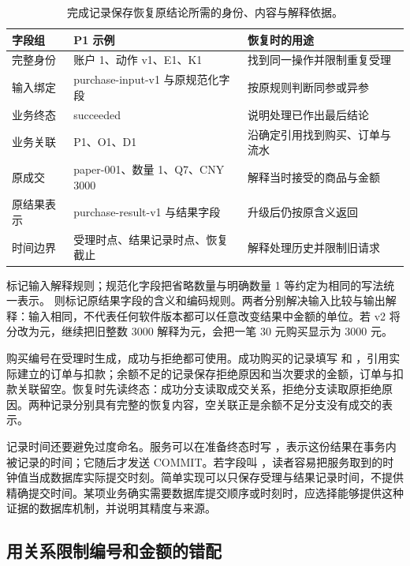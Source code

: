 \begin{table}[htbp]
\centering\small
\begin{tabularx}{\linewidth}{@{}p{2cm}p{4.8cm}X@{}}
\toprule
字段组 & P1 示例 & 恢复时的用途\\
\midrule
完整身份 & 账户 1、动作 v1、E1、K1 & 找到同一操作并限制重复受理\\
输入绑定 & purchase-input-v1 与原规范化字段 & 按原规则判断同参或异参\\
业务终态 & succeeded & 说明处理已作出最后结论\\
业务关联 & P1、O1、D1 & 沿确定引用找到购买、订单与流水\\
原成交 & paper-001、数量 1、Q7、CNY 3000 & 解释当时接受的商品与金额\\
原结果表示 & purchase-result-v1 与结果字段 & 升级后仍按原含义返回\\
时间边界 & 受理时点、结果记录时点、恢复截止 & 解释处理历史并限制旧请求\\
\bottomrule
\end{tabularx}
\caption{完成记录保存恢复原结论所需的身份、内容与解释依据。}
\end{table}

 标记输入解释规则；规范化字段把省略数量与明确数量 1 等约定为相同的写法统一表示。 则标记原结果字段的含义和编码规则。两者分别解决输入比较与输出解释：输入相同，不代表任何软件版本都可以任意改变结果中金额的单位。若 v2 将分改为元，继续把旧整数 3000 解释为元，会把一笔 30 元购买显示为 3000 元。

购买编号在受理时生成，成功与拒绝都可使用。成功购买的记录填写  和 ，引用实际建立的订单与扣款；余额不足的记录保存拒绝原因和当次要求的金额，订单与扣款关联留空。恢复时先读终态：成功分支读取成交关系，拒绝分支读取原拒绝原因。两种记录分别具有完整的恢复内容，空关联正是余额不足分支没有成交的表示。



记录时间还要避免过度命名。服务可以在准备终态时写 ，表示这份结果在事务内被记录的时间；它随后才发送 COMMIT。若字段叫 ，读者容易把服务取到的时钟值当成数据库实际提交时刻。简单实现可以只保存受理与结果记录时间，不提供精确提交时间。某项业务确实需要数据库提交顺序或时刻时，应选择能够提供这种证据的数据库机制，并说明其精度与来源。

\subsection*{用关系限制编号和金额的错配}

